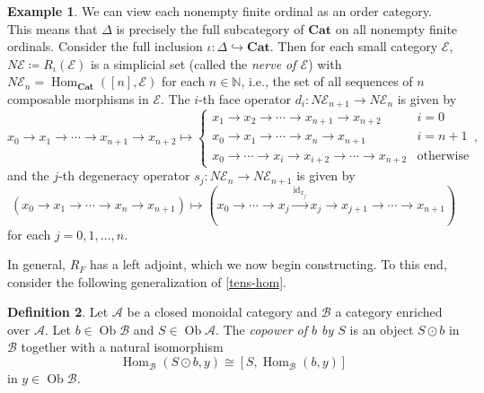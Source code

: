 \documentclass[10pt,letterpaper,cm]{nupset}
\theoremstyle{definition}
\newtheorem{definition}{Definition}[subsection]
\newtheorem{exmp}[definition]{Example}
\theoremstyle{theorem}
\theoremstyle{remark}
\DeclareMathOperator{\ob}{Ob}
\newcommand{\0}{\mathbf{0}}
\newcommand{\1}{\mathbf{1}}
\newcommand{\2}{\mathbf{2}}
\DeclareMathOperator{\set}{\mathbf{Set}}
\renewcommand{\a}{\mathscr{A}}
\renewcommand{\b}{\mathscr{B}}
\renewcommand{\d}{\mathscr{D}}
\newcommand{\e}{\mathscr{E}}
\newcommand{\N}{\mathbb N}
\DeclareMathOperator{\Hom}{Hom}
\DeclareMathOperator{\idd}{id}
\begin{document}
\begin{exmp}\label{nerve}
We can view each nonempty finite ordinal  as an order category. This means that $\varDelta$ is precisely the full subcategory of $\mathbf{Cat}$ on all nonempty finite ordinals. Consider the full inclusion $\iota : \varDelta \hookrightarrow \mathbf{Cat}$. Then for each small category $\e$, $N{\e} \coloneqq R_{\iota}(\e)$ is a simplicial set (called the \textit{nerve of $\e$}) with $N{\e}_n = \Hom_{\mathbf{Cat}}(\left[n\right], \e)$ for each $n\in \N$, i.e.,  the set of all sequences of $n$ composable morphisms in $\e$.
The $i$-th face operator $d_i : N{\e}_{n+1}\to N{\e}_n$ is given by
\[
{x_0 \to x_1 \to \cdots \to x_{n+1} \to x_{n+2}} \mapsto \begin{cases}
{x_1 \to x_2\to \cdots \to x_{n+1} \to x_{n+2}} & i=0
\\ {x_0 \to x_1 \to \cdots \to x_n\to x_{n+1}} & i= n+1
\\ {x_0  \to \cdots \to x_i \to x_{i+2} \to \cdots  \to x_{n+2}} & \text{otherwise}
\end{cases}
,\] 
and the $j$-th degeneracy operator $s_j : N{\e}_n \to N{\e}_{n+1}$ is given by
\[
\left( x_0 \to x_1 \to \cdots \to x_{n} \to x_{n+1}\right) \mapsto  \left({x_0 \to \cdots \to x_j \xrightarrow{\idd_{x_j}} x_j \to x_{j+1} \to \cdots \to x_{n+1}}\right)  
\] for each $j=0,1, \ldots, n$.
\end{exmp}

In general, $R_F$ has a left adjoint, which we now begin constructing. To this end, consider the following generalization of \cref{tens-hom}. 

\begin{comment}
For each $x\in \ob{\d}$ and $n\in \N$, let $$R{x_n}= \Hom_{\d}(F[n], x).$$ Define the face operator $d_i : R{x_{n+1}} \to R{x_n}$ and the degeneracy operator $s_i : R{x_n} \to R{x_{n+1}}$ as the set maps $\Hom_{\d}(F(\delta_i^n), x)$ and $\Hom_{\d}(F(\sigma_i^n), x)$, respectively. By functoriality of $F$, the $F(\delta_i^n)$ and $F(\sigma_i^n)$ satisfy the cosimplicial identities. Since $\Hom_{\d}(F(-), x)$ is a contravariant functor $ \varDelta \to \set$, it follows that the $d_i$ and $s_i$ satisfy the simplicial identities, thereby making $\left(R{x_n}\right)$ into a simplicial set.
\end{comment}

\begin{definition}
Let $\a$ be a closed monoidal category and $\b$ a category enriched over $\a$. Let $b\in \ob{\b}$ and $S\in \ob{\a}$. The \textit{copower of $b$ by $S$} is an object $S\odot b$ in $\b$ together with a natural isomorphism
\[
\Hom_{\b}(S\odot b, y) \cong \left[S, \Hom_{\b}(b,y)\right]
\] in $y \in \ob{\b}$.
\end{definition}
\end{document}
